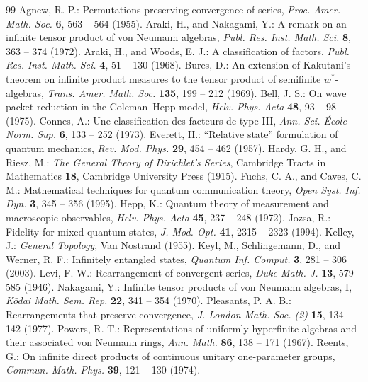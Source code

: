 \documentclass[twoside,11pt,letter]{article}
\theoremstyle{definition}
\theoremstyle{definition}
\theoremstyle{plain}
\begin{document}
\begin{thebibliography}{99}
 Agnew, R. P.: Permutations preserving convergence of series, \textit{Proc. Amer. Math. Soc.} \textbf{6}, 563 -- 564 (1955).
 Araki, H., and Nakagami, Y.: A remark on an infinite tensor product of von Neumann algebras, \textit{Publ. Res. Inst. Math. Sci.} \textbf{8}, 363 -- 374 (1972).
 Araki, H., and Woods, E. J.: A classification of factors, \textit{Publ. Res. Inst. Math. Sci.} \textbf{4}, 51 -- 130 (1968).
 Bures, D.: An extension of Kakutani's theorem on infinite product measures to the tensor product of semifinite $w^\ast$-algebras, \textit{Trans. Amer. Math. Soc.} \textbf{135}, 199 -- 212 (1969).
 Bell, J. S.: On wave packet reduction in the Coleman--Hepp model, \textit{Helv. Phys. Acta} \textbf{48}, 93 -- 98 (1975).
 Connes, A.: Une classification des facteurs de type III,  \textit{Ann. Sci. \'Ecole Norm. Sup.} \textbf{6}, 133 -- 252 (1973).
 Everett, H.: ``Relative state'' formulation of quantum mechanics, \textit{Rev. Mod. Phys.} \textbf{29}, 454 -- 462 (1957).
 Hardy, G. H., and Riesz, M.: \textit{The General Theory of Dirichlet's Series}, Cambridge Tracts in Mathematics \textbf{18}, Cambridge University Press (1915).
 Fuchs, C. A., and Caves, C. M.: Mathematical techniques for quantum communication theory, \textit{Open Syst. Inf. Dyn.} \textbf{3}, 345 -- 356 (1995).
 Hepp, K.: Quantum theory of measurement and macroscopic observables, \textit{Helv. Phys. Acta} \textbf{45}, 237 -- 248 (1972).
 Jozsa, R.: Fidelity for mixed quantum states, \textit{J. Mod. Opt.} \textbf{41}, 2315 -- 2323 (1994).
 Kelley, J.: \textit{General Topology}, Van Nostrand (1955).
 Keyl, M., Schlingemann, D., and Werner, R. F.: Infinitely entangled states, \textit{Quantum Inf. Comput.} \textbf{3}, 281 -- 306 (2003).
 Levi, F. W.: Rearrangement of convergent series, \textit{Duke Math. J.} \textbf{13}, 579 -- 585 (1946).
 Nakagami, Y.: Infinite tensor products of von Neumann algebras, I, \textit{K\=odai Math. Sem. Rep.} \textbf{22}, 341 -- 354 (1970).
 Pleasants, P. A. B.: Rearrangements that preserve convergence, \textit{J. London Math. Soc. (2)} \textbf{15}, 134 -- 142 (1977).
 Powers, R. T.: Representations of uniformly hyperfinite algebras and their associated von Neumann rings, \textit{Ann. Math.} \textbf{86}, 138 -- 171 (1967).
 Reents, G.: On infinite direct products of continuous unitary one-parameter groups, \textit{Commun. Math. Phys.} \textbf{39}, 121 -- 130 (1974).

\end{thebibliography}
\end{document}
